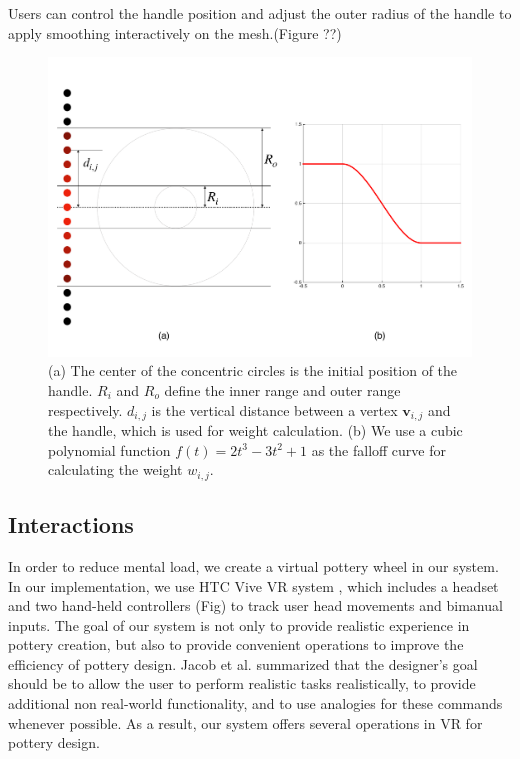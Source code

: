Users can control the handle position and adjust the outer radius of the handle to apply smoothing interactively on the mesh.(Figure ??)

\begin{figure}
  \includegraphics[width=\textwidth]{fig6.pdf}
\caption{(a) The center of the concentric circles is the initial position of the handle. $R_{i}$ and $R_{o}$ define the inner range and outer range respectively. $d_{i,j}$ is the vertical distance between a vertex $\mathbf{v}_{i,j}$ and the handle, which is used for weight calculation. (b) We use a cubic polynomial function $f(t) = 2t^3 - 3t^2 + 1$ as the falloff curve for calculating the weight $w_{i,j}$. }
\label{fig:6}       %
\end{figure}

\subsection{Interactions}
\label{sec:4.3}

In order to reduce mental load, we create a virtual pottery wheel in our system.
In our implementation, we use HTC Vive VR system \cite{website:vive}, which includes a headset and two hand-held controllers (Fig) to track user head movements and bimanual inputs.
The goal of our system is not only to provide realistic experience in pottery creation, but also to provide convenient operations to improve the efficiency of pottery design. 
Jacob et al. \cite{Jacob2008Reality} summarized that the designer's goal should be to allow the user to perform realistic tasks realistically, to provide additional non real-world functionality, and to use analogies for these commands whenever possible.
As a result, our system offers several operations in VR for pottery design.

